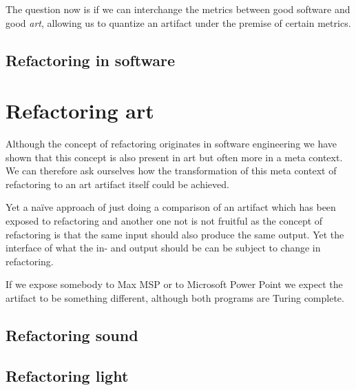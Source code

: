 \documentclass[10pt,twocolumn,letterpaper]{article}
\begin{document}
The question now is if we can interchange the metrics between good software and good \textit{art}, allowing
us to quantize an artifact under the premise of certain metrics.

\subsection{Refactoring in software}

\section{Refactoring art}

Although the concept of refactoring originates in software engineering we have shown that this concept is also
present in art but often more in a meta context.
We can therefore ask ourselves how the transformation of this meta context of refactoring to an art artifact itself
could be achieved.

Yet a naïve approach of just doing a comparison of an artifact which has been exposed to refactoring and another one
not is not fruitful as the concept of refactoring is that the same input should also produce the same output.
Yet the interface of what the in- and output should be can be subject to change in refactoring.

If we expose somebody to Max MSP or to Microsoft Power Point we expect the artifact to be something different, although
both programs are Turing complete.

\subsection{Refactoring sound}

\subsection{Refactoring light}
\end{document}
